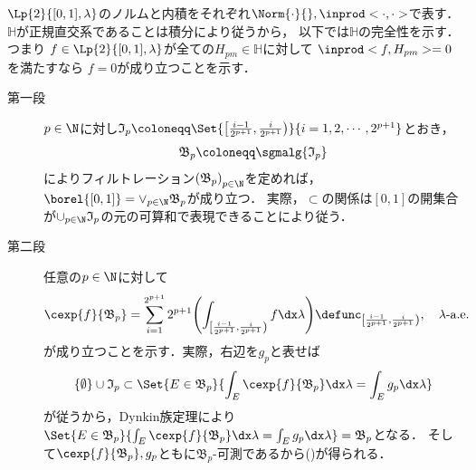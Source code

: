 	\begin{prf}
		$\Lp{2}{[0,1],\lambda}$のノルムと内積をそれぞれ$\Norm{\cdot}{},\inprod<\cdot,\cdot>$で表す．
		$\mathbb{H}$が正規直交系であることは積分により従うから，
		以下では$\mathbb{H}$の完全性を示す．つまり
		$f \in \Lp{2}{[0,1],\lambda}$が全ての$H_{pm} \in \mathbb{H}$に対して
		$\inprod<f,H_{pm}> = 0$を満たすなら
		$f = 0$が成り立つことを示す．
		\begin{description}
			\item[第一段]
				$p \in \N$に対し$\mathfrak{I}_p \coloneqq \Set{ \left[ \frac{i-1}{2^{p+1}}, \frac{i}{2^{p+1}} \right)}{ i = 1,2,\cdots,2^{p+1} }$とおき，
				\begin{align}
					\mathfrak{B}_p \coloneqq \sgmalg{\mathfrak{I}_p}
				\end{align}
				によりフィルトレーション$\left( \mathfrak{B}_p \right)_{p \in \N}$を定めれば，$\borel{[0,1]} = \vee_{p \in \N} \mathfrak{B}_p$が成り立つ．
				実際，$\subset$の関係は$[0,1]$の開集合が$\cup_{p \in \N} \mathfrak{I}_p$の元の可算和で表現できることにより従う．
				
			\item[第二段]
				任意の$p \in \N$に対して
				\begin{align}
					\cexp{f}{\mathfrak{B}_p} = \sum_{i=1}^{2^{p+1}} 2^{p+1} \Biggl( \int_{\left[ \frac{i-1}{2^{p+1}}, \frac{i}{2^{p+1}} \right)} f \dx\lambda
						\Biggr) \defunc_{\left[ \frac{i-1}{2^{p+1}}, \frac{i}{2^{p+1}} \right)}
					,\quad \mbox{$\lambda$-a.e.}
					\label{eq:thm_Haar_functions_orthonormal_basis_1}
 				\end{align}
 				が成り立つことを示す．実際，右辺を$g_p$と表せば
 				\begin{align}
 					\{\emptyset\} \cup \mathfrak{I}_p \subset
 					\Set{E \in \mathfrak{B}_p}{\int_E \cexp{f}{\mathfrak{B}_p} \dx\lambda = \int_E g_p \dx\lambda}
 					\label{eq:thm_Haar_functions_orthonormal_basis_2}
 				\end{align}
 				が従うから，Dynkin族定理により$\Set{E \in \mathfrak{B}_p}{\int_E \cexp{f}{\mathfrak{B}_p} \dx\lambda = \int_E g_p \dx\lambda} = \mathfrak{B}_p$となる．
 				そして$\cexp{f}{\mathfrak{B}_p},g_p$ともに$\mathfrak{B}_p$-可測であるから()が得られる．
 				

\end{description}
\end{prf}

